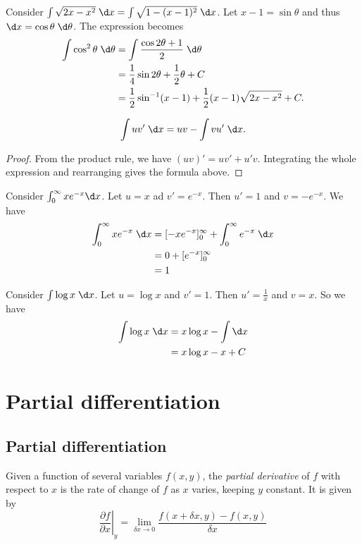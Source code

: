 \documentclass[a4paper]{article}
\begin{document}
\begin{eg}
  Consider $\int \sqrt{2x - x^2}\;\d x = \int\sqrt{1 - (x - 1)^2}\;\d x$. Let $x - 1=\sin\theta$ and thus $\d x = \cos \theta\;\d\theta$. The expression becomes
  \begin{align*}
    \int \cos^2\theta \;\d \theta &= \int\frac{\cos 2\theta + 1}{2}\;\d \theta\\
    &= \frac{1}{4}\sin 2\theta + \frac{1}{2}\theta + C\\
    &= \frac{1}{2}\sin^{-1}(x - 1) + \frac{1}{2}(x - 1)\sqrt{2x - x^2} + C.
  \end{align*}
\end{eg}

\begin{thm}
  \[
  \int uv'\;\d x = uv - \int vu' \;\d x.
  \]
\end{thm}

\begin{proof}
  From the product rule, we have $(uv)' = uv' + u'v$. Integrating the whole expression and rearranging gives the formula above.
\end{proof}

\begin{eg}
  Consider $\int_0^\infty xe^{-x}\d x$. Let $u = x$ ad $v' = e^{-x}$. Then $u' = 1$ and $v = -e^{-x}$. We have
  \begin{align*}
    \int_0^\infty xe^{-x}\;\d x &= [-xe^{-x}]^\infty_0 + \int_0^\infty e^{-x} \;\d x\\
    &= 0 + [e^{-x}]_0^\infty\\
    &= 1
  \end{align*}
\end{eg}

\begin{eg}
  Consider $\int \log x\; \d x$. Let $u = \log x$ and $v' = 1$. Then $u' = \frac{1}{x}$ and $v = x$. So we have
  \begin{align*}
    \int \log x\; \d x &= x\log x - \int \d x\\
    &= x \log x - x + C
  \end{align*}
\end{eg}

\section{Partial differentiation}
\subsection{Partial differentiation}
\begin{defi}
  Given a function of several variables $f(x, y)$, the \emph{partial derivative} of $f$ with respect to $x$ is the rate of change of $f$ as $x$ varies, keeping $y$ constant. It is given by
  \[
  \left. \frac{\partial f}{\partial x}\right|_y = \lim_{\delta x\to 0} \frac{f(x + \delta x, y) - f(x, y)}{\delta x}
  \]
\end{defi}
\end{document}
